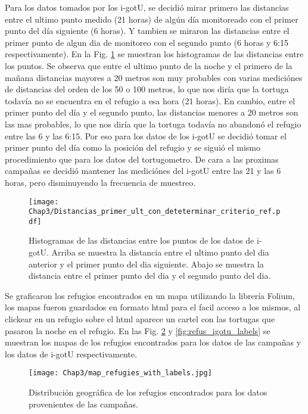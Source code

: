 Para los datos tomados por los i-gotU, se decidió mirar primero las distancias entre el ultimo punto medido (21 horas) de algún día monitoreado con el primer punto del día siguiente (6 horas). Y tambien se miraron las distancias entre el primer punto de algun dia de monitoreo con el segundo punto (6 horas y 6:15 respectivamente). En la Fig. \ref{fig:distancias} se muestran los histogramas de las distancias entre los puntos. Se observa que entre el ultimo punto de la noche y el primero de la mañana distancias mayores a 20 metros son muy probables con varias mediciónes de distancias del orden de los 50 o 100 metros, lo que nos diría que la tortuga todavía no se encuentra en el refugio a esa hora (21 horas). En cambio, entre el primer punto del día y el segundo punto, las distancias menores a 20 metros son las mas probables, lo que nos diría que la tortuga todavía no abandonó el refugio entre las 6 y las 6:15. Por eso para los datos de los i-gotU se decidió tomar el primer punto del día como la posición del refugio y se siguió el mismo procedimiento que para los datos del tortugometro. De cara a las proximas campañas se decidió mantener las mediciónes del i-gotU entre las 21 y las 6 horas, pero disminuyendo la frecuencia de muestreo. 


\begin{figure}[ht]
    \begin{center}
        \texttt{[image: Chap3/Distancias\_primer\_ult\_con\_deteterminar\_criterio\_ref.pdf]}
        \caption[Histogramas de las distancias entre los puntos de los datos de i-gotU.]{ Histogramas de las distancias entre los puntos de los datos de i-gotU. Arriba se muestra la distancia entre el ultimo punto del dia anterior y el primer punto del dia siguiente. Abajo se muestra la distancia entre el primer punto del dia y el segundo punto del dia.} 
        \label{fig:distancias}
        \end{center}
\end{figure} 

Se graficaron los refugios encontrados en un mapa utilizando la librería Folium, los mapas fueron guardados en formato html para el facil acceso a los mismos, al clickear en un refugio sobre el html aparece un cartel con las tortugas que pasaron la noche en el refugio. En las Fig. \ref{fig:refus_campanas_con_labels} y \ref{fig:refus_igotu_labels} se muestran los mapas de los refugios encontrados para los datos de las campañas y los datos de i-gotU respectivamente.


\begin{figure}[ht]
    \begin{center}
        \texttt{[image: Chap3/map\_refugies\_with\_labels.jpg]}
        \caption{Distribución geográfica de los refugios encontrados para los datos provenientes de las campañas.} 
        \label{fig:refus_campanas_con_labels}
        
        \end{center}
\end{figure} 

